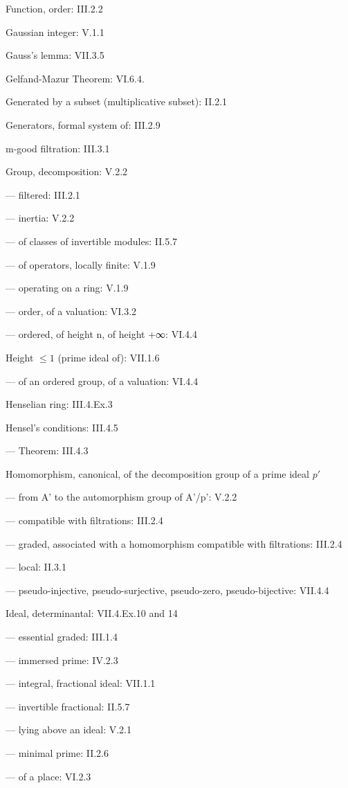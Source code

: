 Function, order: III.2.2

Gaussian integer: V.1.1

Gauss's lemma: VII.3.5

Gelfand-Mazur Theorem: VI.6.4.

Generated by a subset (multiplicative subset): II.2.1

Generators, formal system of: III.2.9

m-good filtration: III.3.1

Group, decomposition: V.2.2

--- filtered: III.2.1

--- inertia: V.2.2

--- of classes of invertible modules: II.5.7

--- of operators, locally finite: V.1.9

--- operating on a ring: V.1.9

--- order, of a valuation: VI.3.2

--- ordered, of height n, of height +∞: VI.4.4

Height \(\leqslant 1\) (prime ideal of): VII.1.6

--- of an ordered group, of a valuation: VI.4.4

Henselian ring: III.4.Ex.3

Hensel's conditions: III.4.5

--- Theorem: III.4.3

Homomorphism, canonical, of the decomposition group of a prime ideal \(p'\)

--- from A' to the automorphism group of A'/p': V.2.2

--- compatible with filtrations: III.2.4

--- graded, associated with a homomorphism compatible with filtrations: III.2.4

--- local: II.3.1

--- pseudo-injective, pseudo-surjective, pseudo-zero, pseudo-bijective: VII.4.4

Ideal, determinantal: VII.4.Ex.10 and 14

--- essential graded: III.1.4

--- immersed prime: IV.2.3

--- integral, fractional ideal: VII.1.1

--- invertible fractional: II.5.7

--- lying above an ideal: V.2.1

--- minimal prime: II.2.6

--- of a place: VI.2.3

